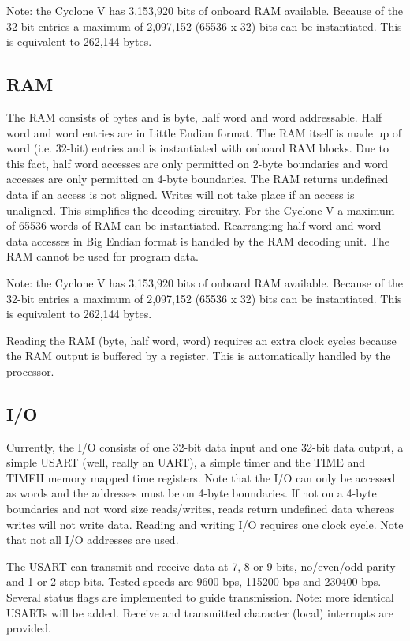 \documentclass[12pt]{article}
\begin{document}
Note: the Cyclone V has 3,153,920 bits of onboard RAM available. Because of the 32-bit entries a maximum of 2,097,152 (65536 x 32) bits can be instantiated. This is equivalent to 262,144 bytes.

\subsection{RAM}
\label{sec:ram}
The RAM consists of bytes and is byte, half word and word addressable. Half word and word entries are in Little Endian format. The RAM itself is made up of word (i.e. 32-bit) entries and is instantiated with onboard RAM blocks. Due to this fact, half word accesses are only permitted on 2-byte boundaries and word accesses are only permitted on 4-byte boundaries. The RAM returns undefined data if an access is not aligned. Writes will not take place if an access is unaligned. This simplifies the decoding circuitry. For the Cyclone V a maximum of 65536 words of RAM can be instantiated. Rearranging half word and word data accesses in Big Endian format is handled by the RAM decoding unit. The RAM cannot be used for program data.

Note: the Cyclone V has 3,153,920 bits of onboard RAM available. Because of the 32-bit entries a maximum of 2,097,152 (65536 x 32) bits can be instantiated. This is equivalent to 262,144 bytes.

Reading the RAM (byte, half word, word) requires an extra clock cycles because the RAM output is buffered by a register. This is automatically handled by the processor.

\subsection{I/O}
\label{sec/io}
Currently, the I/O consists of one 32-bit data input and one 32-bit data output, a simple USART (well, really an UART), a simple timer and the TIME and TIMEH memory mapped time registers. Note that the I/O can only be accessed as words and the addresses must be on 4-byte boundaries. If not on a 4-byte boundaries and not word size reads/writes, reads return undefined data whereas writes will not write data. Reading and writing I/O requires one clock cycle. Note that not all I/O addresses are used.

The USART can transmit and receive data at 7, 8 or 9 bits, no/even/odd parity and 1 or 2 stop bits. Tested speeds are 9600 bps, 115200 bps and 230400 bps. Several status flags are implemented to guide transmission. Note: more identical USARTs will be added. Receive and transmitted character (local) interrupts are provided.
\end{document}
